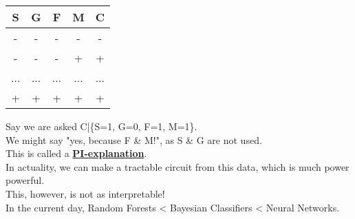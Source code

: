 \documentclass[../../lecture_notes.tex]{subfiles}
\begin{document}
\begin{center}\begin{minipage} {0.6\textwidth}\begin{center}\end{center}\end{minipage}%
\begin{minipage}{0.4\textwidth}\begin{center}\begin{tabular} { | c | c | c | c | c |}\hline
	S & G & F & M & C\\\hline
	- & - & - & - & -\\
	- & - & - & + & +\\
	... & ...  & ... & ... & ...\\
	+ & + & + & + & +\\\hline
\end{tabular}\end{center}\end{minipage}\end{center}\bigskip

\noindent Say we are asked C|\{S=1, G=0, F=1, M=1\}.\\
We might say "yes, because F \& M!", as S \& G are not used.\\
This is called a \textbf{\underline{PI-explanation}}.\\
In actuality, we can make a tractable circuit from this data, which is much power powerful.\\
This, however, is not as interpretable!\\
In the current day, Random Forests < Bayesian Classifiers < Neural Networks.
\end{document}
